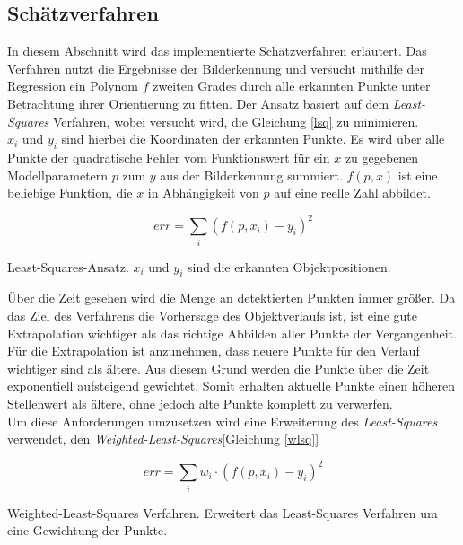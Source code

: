 \subsection{Schätzverfahren}
\label{sec_curveFit}
In diesem Abschnitt wird das implementierte Schätzverfahren erläutert. Das Verfahren nutzt die Ergebnisse der Bilderkennung und versucht mithilfe der Regression ein Polynom $f$ zweiten Grades durch alle erkannten Punkte unter Betrachtung ihrer Orientierung zu fitten.
Der Ansatz basiert auf dem \textit{Least-Squares} Verfahren\cite{simon2006optimal}, wobei versucht wird, die Gleichung \ref{lsq} zu minimieren.\\
$x_i$ und $y_i$ sind hierbei die Koordinaten der erkannten Punkte. Es wird über alle Punkte der quadratische Fehler vom Funktionswert für ein $x$ zu gegebenen Modellparametern $p$ zum $y$ aus der Bilderkennung summiert. $f(p,x)$ ist eine beliebige Funktion, die $x$ in Abhängigkeit von $p$ auf eine reelle Zahl abbildet.\\
\begin{ownequation}[H]
\begin{equation}
err = \sum_{i}(f(p,x_i)-y_i)^2
\end{equation}
\caption[Least-Squares-Ansatz]{Least-Squares-Ansatz. $x_i$ und $y_i$ sind die erkannten Objektpositionen.}
\label{lsq}
\end{ownequation}
Über die Zeit gesehen wird die Menge an detektierten Punkten immer größer. Da das Ziel des Verfahrens die Vorhersage des Objektverlaufs ist, ist eine gute Extrapolation wichtiger als das richtige Abbilden aller Punkte der Vergangenheit. Für die Extrapolation ist anzunehmen, dass neuere Punkte für den Verlauf wichtiger sind als ältere. Aus diesem Grund werden die Punkte über die Zeit exponentiell aufsteigend gewichtet. Somit erhalten aktuelle Punkte einen höheren Stellenwert als ältere, ohne jedoch alte Punkte komplett zu verwerfen.\\
Um diese Anforderungen umzusetzen wird eine Erweiterung des \textit{Least-Squares} verwendet, den \textit{Weighted-Least-Squares}[Gleichung \ref{wlsq}]\\
\begin{ownequation}[H]
\begin{equation}
err = \sum_{i}w_i \cdot (f(p,x_i)-y_i)^2
\end{equation}
\caption[Weighted-Least-Squares-Verfahren]{Weighted-Least-Squares Verfahren. Erweitert das Least-Squares Verfahren um eine Gewichtung der Punkte.}
\label{wlsq}
\end{ownequation}

